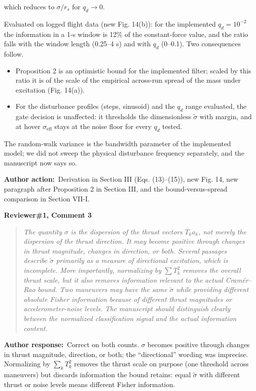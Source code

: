 \documentclass[11pt]{article}
\newcommand{\concern}[1]{\par\medskip\noindent\colorbox{gray!12}{\parbox{\dimexpr\linewidth-2\fboxsep}{\textbf{#1}}}\par\smallskip}
\newcommand{\rlabel}[1]{\par\textbf{#1}\ }
\begin{document}
which reduces to $\sigma/r_s$ for $q_d \to 0$.

Evaluated on logged flight data (new Fig. 14(b)): for the implemented $q_d = 10^{-2}$ the information in a 1-s window is 12\% of the constant-force value, and the ratio falls with the window length (0.25--4 s) and with $q_d$ (0--0.1). Two consequences follow.

\begin{itemize}[leftmargin=1.4em]
\item Proposition 2 is an optimistic bound for the implemented filter; scaled by this ratio it is of the scale of the empirical across-run spread of the mass under excitation (Fig. 14(a)).
\item For the disturbance profiles (steps, sinusoid) and the $q_d$ range evaluated, the gate decision is unaffected: it thresholds the dimensionless $\tilde\sigma$ with margin, and at hover $\sigma_{\mathrm{eff}}$ stays at the noise floor for every $q_d$ tested.
\end{itemize}

The random-walk variance is the bandwidth parameter of the implemented model; we did not sweep the physical disturbance frequency separately, and the manuscript now says so.

\rlabel{Author action:}Derivation in Section III (Eqs. (13)--(15)), new Fig. 14, new paragraph after Proposition 2 in Section III, and the bound-versus-spread comparison in Section VII-I.

\concern{Reviewer\#1, Comment 3}

\begin{quote}\itshape The quantity $\sigma$ is the dispersion of the thrust vectors $T_k a_k$, not merely the dispersion of the thrust direction. It may become positive through changes in thrust magnitude, changes in direction, or both. Several passages describe $\tilde\sigma$ primarily as a measure of directional excitation, which is incomplete. More importantly, normalizing by $\sum T_k^2$ removes the overall thrust scale, but it also removes information relevant to the actual Cram\'er--Rao bound. Two maneuvers may have the same $\tilde\sigma$ while providing different absolute Fisher information because of different thrust magnitudes or accelerometer-noise levels. The manuscript should distinguish clearly between the normalized classification signal and the actual information content.\end{quote}

\rlabel{Author response:}Correct on both counts. $\sigma$ becomes positive through changes in thrust magnitude, direction, or both; the ``directional'' wording was imprecise. Normalizing by $\sum_k T_k^2$ removes the thrust scale on purpose (one threshold across maneuvers) but discards information the bound retains: equal $\tilde\sigma$ with different thrust or noise levels means different Fisher information.
\end{document}
